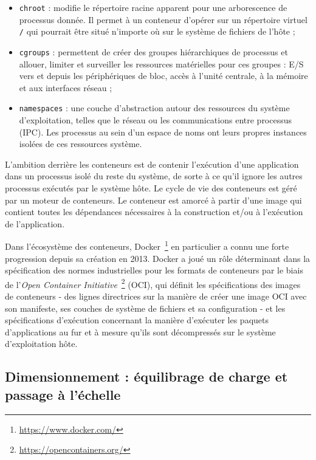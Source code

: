 \begin{itemize}
    \item \texttt{chroot} : modifie le répertoire racine apparent pour une arborescence de processus donnée. Il permet à un conteneur d'opérer sur un répertoire virtuel \texttt{/} qui pourrait être situé n'importe où sur le système de fichiers de l'hôte ;
    \item \texttt{cgroups} : permettent de créer des groupes hiérarchiques de processus et allouer, limiter et surveiller les ressources matérielles pour ces groupes : E/S vers et depuis les périphériques de bloc, accès à l'unité centrale, à la mémoire et aux interfaces réseau ;
    \item \texttt{namespaces} : une couche d'abstraction autour des ressources du système d'exploitation, telles que le réseau ou les communications entre processus (IPC). Les processus au sein d'un espace de noms ont leurs propres instances isolées de ces ressources système.
\end{itemize}

L'ambition derrière les conteneurs est de contenir l'exécution d'une application dans un processus isolé du reste du système, de sorte à ce qu'il ignore les autres processus exécutés par le système hôte. Le cycle de vie des conteneurs est géré par un moteur de conteneurs. Le conteneur est amorcé à partir d'une image qui contient toutes les dépendances nécessaires à la construction et/ou à l'exécution de l'application.

Dans l'écosystème des conteneurs, Docker~\footnote{\href{https://www.docker.com/}{https://www.docker.com/}} en particulier a connu une forte progression depuis sa création en 2013. Docker a joué un rôle déterminant dans la spécification des normes industrielles pour les formats de conteneurs par le biais de l'\textit{Open Container Initiative}~\footnote{\href{https://opencontainers.org/}{https://opencontainers.org/}} (OCI), qui définit les spécifications des images de conteneurs - des lignes directrices sur la manière de créer une image OCI avec son manifeste, ses couches de système de fichiers et sa configuration - et les spécifications d'exécution concernant la manière d'exécuter les paquets d'applications au fur et à mesure qu'ils sont décompressés sur le système d'exploitation hôte.

\subsection{Dimensionnement : équilibrage de charge et passage à l'échelle}

